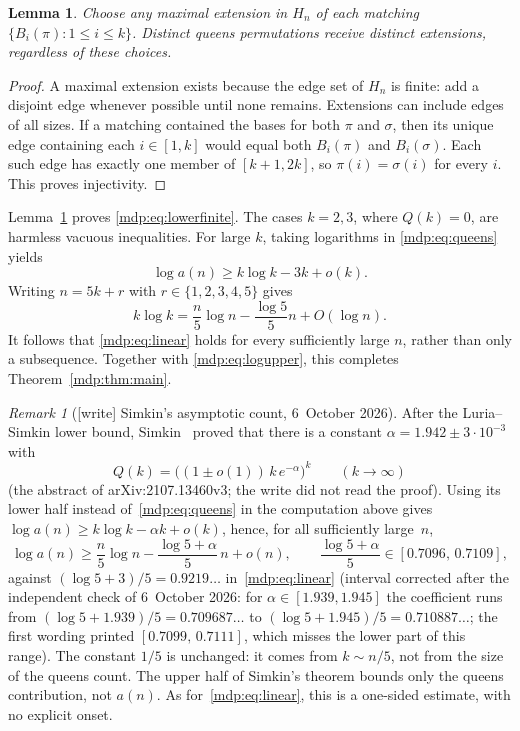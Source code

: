 \documentclass[11pt,letterpaper]{article}
\numberwithin{equation}{section}
\newtheorem{lemma}[theorem]{Lemma}
\theoremstyle{remark}\newtheorem{remark}[theorem]{Remark}
\begin{document}
\begin{lemma}\label{mdp:lem:extension}
Choose any maximal extension in $H_n$ of each matching
$\{B_i(\pi):1\le i\le k\}$. Distinct queens permutations receive
distinct extensions, regardless of these choices.
\end{lemma}
\begin{proof}
A maximal extension exists because the edge set of $H_n$ is finite:
add a disjoint edge whenever possible until none remains. Extensions
can include edges of all sizes. If a matching contained the bases for
both $\pi$ and $\sigma$, then its unique edge containing each
$i\in[1,k]$ would equal both $B_i(\pi)$ and $B_i(\sigma)$. Each such
edge has exactly one member of $[k+1,2k]$, so $\pi(i)=\sigma(i)$ for
every $i$. This proves injectivity.
\end{proof}
Lemma~\ref{mdp:lem:extension} proves \eqref{mdp:eq:lowerfinite}.
The cases $k=2,3$, where $Q(k)=0$, are harmless vacuous inequalities.
For large $k$, taking logarithms in \eqref{mdp:eq:queens} yields
\[
 \log a(n)\ge k\log k-3k+o(k).
\]
Writing $n=5k+r$ with $r\in\{1,2,3,4,5\}$ gives
\[
 k\log k=\frac n5\log n-\frac{\log5}{5}n+O(\log n).
\]
It follows that \eqref{mdp:eq:linear} holds for every sufficiently large
$n$, rather than only a subsequence. Together with
\eqref{mdp:eq:logupper}, this completes Theorem~\ref{mdp:thm:main}.


\begin{remark}[{[write]} Simkin's asymptotic count, 6~October 2026]\label{mdp:rem:simkin}
After the Luria--Simkin lower bound, Simkin~\cite{simkin} proved that there
is a constant $\alpha=1.942\pm3\cdot10^{-3}$ with
\[
 Q(k)=\bigl((1\pm o(1))\,k\,e^{-\alpha}\bigr)^k\qquad(k\to\infty)
\]
(the abstract of arXiv:2107.13460v3; the write did not read the proof).
Using its lower half instead of~\eqref{mdp:eq:queens} in the computation
above gives $\log a(n)\ge k\log k-\alpha k+o(k)$, hence, for all
sufficiently large~$n$,
\[
 \log a(n)\ge\frac n5\log n-\frac{\log5+\alpha}{5}\,n+o(n),
 \qquad \frac{\log5+\alpha}{5}\in[0.7096,\,0.7109],
\]
against $(\log5+3)/5=0.9219\ldots$ in~\eqref{mdp:eq:linear}
\textup{(interval corrected after the independent check of 6~October 2026:
for $\alpha\in[1.939,1.945]$ the coefficient runs from
$(\log5+1.939)/5=0.709687\ldots$ to $(\log5+1.945)/5=0.710887\ldots$; the
first wording printed $[0.7099,\,0.7111]$, which misses the lower part of
this range)}. The constant
$1/5$ is unchanged: it comes from $k\sim n/5$, not from the size of the
queens count. The upper half of Simkin's theorem bounds only the queens
contribution, not $a(n)$. As for~\eqref{mdp:eq:linear}, this is a
one-sided estimate, with no explicit onset.
\end{remark}
\end{document}
